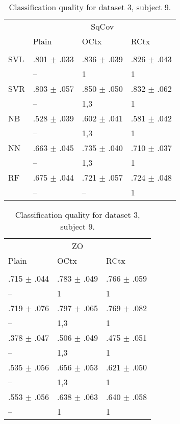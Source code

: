 \begin{table}[htb]
\renewcommand{\arraystretch}{0.6}
\centering
\footnotesize
\caption{Classification quality for dataset 3, subject 9.\label{table:Set3_patient9_res}}
\begin{tabular}{llll}
 & \multicolumn{3}{c}{SqCov} \\
 & Plain & OCtx & RCtx \\
 \cmidrule(lr){2-4}\\
SVL & .801 $\pm$ .033 & .836 $\pm$ .039 & .826 $\pm$ .043 \\
 & -- & {\scriptsize 1} & {\scriptsize 1} \\
SVR & .803 $\pm$ .057 & .850 $\pm$ .050 & .832 $\pm$ .062 \\
 & -- & {\scriptsize 1,3} & {\scriptsize 1} \\
NB & .528 $\pm$ .039 & .602 $\pm$ .041 & .581 $\pm$ .042 \\
 & -- & {\scriptsize 1,3} & {\scriptsize 1} \\
NN & .663 $\pm$ .045 & .735 $\pm$ .040 & .710 $\pm$ .037 \\
 & -- & {\scriptsize 1,3} & {\scriptsize 1} \\
RF & .675 $\pm$ .044 & .721 $\pm$ .057 & .724 $\pm$ .048 \\
 & -- & -- & {\scriptsize 1} \\
\end{tabular}%
\begin{tabular}{lll}
 \multicolumn{3}{c}{ZO} \\
  Plain & OCtx & RCtx \\
  \cmidrule(lr){1-3}\\
.715 $\pm$ .044 & .783 $\pm$ .049 & .766 $\pm$ .059 \\
  -- & {\scriptsize 1} & {\scriptsize 1} \\
 .719 $\pm$ .076 & .797 $\pm$ .065 & .769 $\pm$ .082 \\
  -- & {\scriptsize 1,3} & {\scriptsize 1} \\
 .378 $\pm$ .047 & .506 $\pm$ .049 & .475 $\pm$ .051 \\
  -- & {\scriptsize 1,3} & {\scriptsize 1} \\
 .535 $\pm$ .056 & .656 $\pm$ .053 & .621 $\pm$ .050 \\
  -- & {\scriptsize 1,3} & {\scriptsize 1} \\
 .553 $\pm$ .056 & .638 $\pm$ .063 & .640 $\pm$ .058 \\
  -- & {\scriptsize 1} & {\scriptsize 1} \\
\end{tabular}
\end{table}